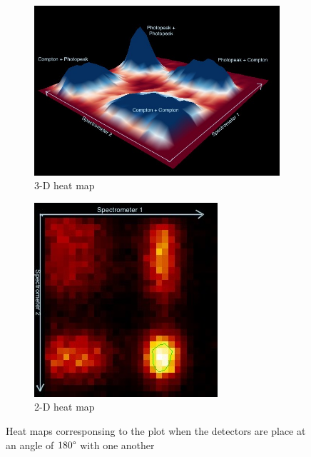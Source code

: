 \documentclass[%
 reprint,
nofootinbib,
 amsmath,amssymb,
 aps,
floatfix,
]{revtex4-2}
\begin{document}
    \begin{figure}
        \centering
        \begin{subfigure}[b]{0.5\textwidth}
            \centering
            \includegraphics[scale = 0.35]{Figures/3D_heat_map.jpg}
            \caption{3-D heat map}
            \label{fig:3d}
        \end{subfigure}
        \hfill
        \begin{subfigure}[b]{0.5\textwidth}
            \centering
            \includegraphics[scale = 0.8]{Figures/2D_heat_map.jpg}
            \caption{2-D heat map}
            \label{fig:2d}
        \end{subfigure}
            \caption{Heat maps corresponsing to the plot when the detectors are place at an angle of $180 \degree$ with one another}
            \label{fig:heat}
    \end{figure}
\end{document}
